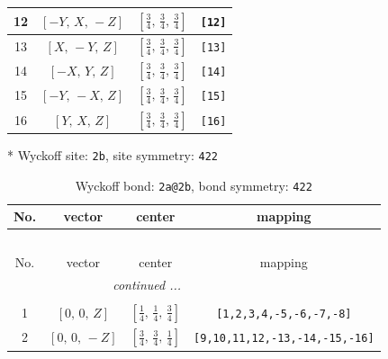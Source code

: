 \documentclass[fleqn,8pt]{jsarticle}
\begin{document}
\begin{longtable}{cccc}
12 & $\left[ - Y,\, X,\, - Z \right]$ & $\left[ \frac{3}{4},\, \frac{3}{4},\, \frac{3}{4} \right]$ & {\tt [12]} \\ \hline
13 & $\left[ X,\, - Y,\, Z \right]$ & $\left[ \frac{3}{4},\, \frac{3}{4},\, \frac{3}{4} \right]$ & {\tt [13]} \\ \hline
14 & $\left[ - X,\, Y,\, Z \right]$ & $\left[ \frac{3}{4},\, \frac{3}{4},\, \frac{3}{4} \right]$ & {\tt [14]} \\ \hline
15 & $\left[ - Y,\, - X,\, Z \right]$ & $\left[ \frac{3}{4},\, \frac{3}{4},\, \frac{3}{4} \right]$ & {\tt [15]} \\ \hline
16 & $\left[ Y,\, X,\, Z \right]$ & $\left[ \frac{3}{4},\, \frac{3}{4},\, \frac{3}{4} \right]$ & {\tt [16]} \\
\end{longtable}
* Wyckoff site: {\tt 2b}, site symmetry: {\tt 422}
\renewcommand{\arraystretch}{1.2}
\begin{longtable}{cccc}
\caption{Wyckoff bond: {\tt 2a@2b}, bond symmetry: {\tt 422}}
 \\
 \hline \hline
No. & vector & center & mapping \\ \hline \endfirsthead

\multicolumn{3}{l}{\tablename\ \thetable{}} \\
 \hline \hline
No. & vector & center & mapping \\ \hline \endhead

 \hline \hline
\multicolumn{3}{r}{\footnotesize\it continued ...} \\ \endfoot

 \hline \hline
\multicolumn{3}{r}{} \\ \endlastfoot

1 & $\left[ 0,\, 0,\, Z \right]$ & $\left[ \frac{1}{4},\, \frac{1}{4},\, \frac{3}{4} \right]$ & {\tt [1,2,3,4,-5,-6,-7,-8]} \\ \hline
2 & $\left[ 0,\, 0,\, - Z \right]$ & $\left[ \frac{3}{4},\, \frac{3}{4},\, \frac{1}{4} \right]$ & {\tt [9,10,11,12,-13,-14,-15,-16]} \\
\end{longtable}
\renewcommand{\arraystretch}{1.2}
\end{document}
